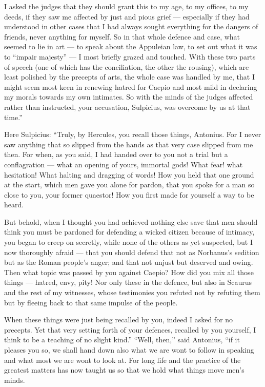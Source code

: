  I asked the judges that they should grant this to my age, to my offices, to my deeds, if they saw me affected by just and pious grief — especially if they had understood in other cases that I had always sought everything for the dangers of friends, never anything for myself. So in that whole defence and case, what seemed to lie in art — to speak about the Appuleian law, to set out what it was to ``impair majesty'' — I most briefly grazed and touched. With these two parts of speech (one of which has the conciliation, the other the rousing), which are least polished by the precepts of arts, the whole case was handled by me, that I might seem most keen in renewing hatred for Caepio and most mild in declaring my morals towards my own intimates. So with the minds of the judges affected rather than instructed, your accusation, Sulpicius, was overcome by us at that time.''

 Here Sulpicius: ``Truly, by Hercules, you recall those things, Antonius. For I never saw anything that so slipped from the hands as that very case slipped from me then. For when, as you said, I had handed over to you not a trial but a conflagration — what an opening of yours, immortal gods! What fear! what hesitation! What halting and dragging of words! How you held that one ground at the start, which men gave you alone for pardon, that you spoke for a man so close to you, your former quaestor! How you first made for yourself a way to be heard.

 But behold, when I thought you had achieved nothing else save that men should think you must be pardoned for defending a wicked citizen because of intimacy, you began to creep on secretly, while none of the others as yet suspected, but I now thoroughly afraid — that you should defend that not as Norbanus's sedition but as the Roman people's anger; and that not unjust but deserved and owing. Then what topic was passed by you against Caepio? How did you mix all those things — hatred, envy, pity! Nor only these in the defence, but also in Scaurus and the rest of my witnesses, whose testimonies you refuted not by refuting them but by fleeing back to that same impulse of the people.

 When these things were just being recalled by you, indeed I asked for no precepts. Yet that very setting forth of your defences, recalled by you yourself, I think to be a teaching of no slight kind.'' ``Well, then,'' said Antonius, ``if it pleases you so, we shall hand down also what we are wont to follow in speaking and what most we are wont to look at. For long life and the practice of the greatest matters has now taught us so that we hold what things move men's minds.

